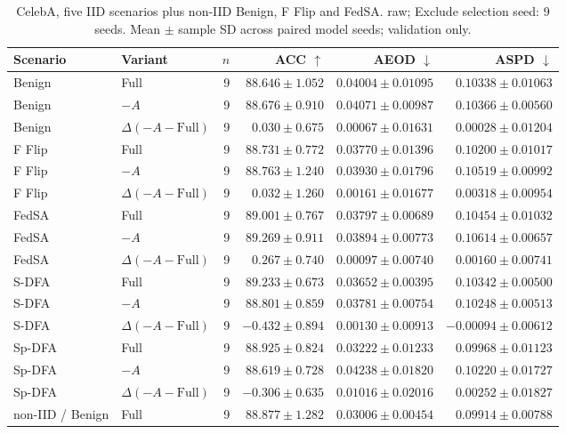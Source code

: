 \begin{table}[t]
\centering
\small
\caption{CelebA, five IID scenarios plus non-IID Benign, F Flip and FedSA. raw; Exclude selection seed: 9 seeds. Mean $\pm$ sample SD across paired model seeds; validation only.}
\begin{tabular}{llrrrr}
\toprule
Scenario & Variant & $n$ & ACC $\uparrow$ & AEOD $\downarrow$ & ASPD $\downarrow$ \\
\midrule
Benign & Full & 9 & $88.646 \pm 1.052$ & $0.04004 \pm 0.01095$ & $0.10338 \pm 0.01063$ \\
Benign & $-A$ & 9 & $88.676 \pm 0.910$ & $0.04071 \pm 0.00987$ & $0.10366 \pm 0.00560$ \\
Benign & $\Delta(-A-\mathrm{Full})$ & 9 & $0.030 \pm 0.675$ & $0.00067 \pm 0.01631$ & $0.00028 \pm 0.01204$ \\
F Flip & Full & 9 & $88.731 \pm 0.772$ & $0.03770 \pm 0.01396$ & $0.10200 \pm 0.01017$ \\
F Flip & $-A$ & 9 & $88.763 \pm 1.240$ & $0.03930 \pm 0.01796$ & $0.10519 \pm 0.00992$ \\
F Flip & $\Delta(-A-\mathrm{Full})$ & 9 & $0.032 \pm 1.260$ & $0.00161 \pm 0.01677$ & $0.00318 \pm 0.00954$ \\
FedSA & Full & 9 & $89.001 \pm 0.767$ & $0.03797 \pm 0.00689$ & $0.10454 \pm 0.01032$ \\
FedSA & $-A$ & 9 & $89.269 \pm 0.911$ & $0.03894 \pm 0.00773$ & $0.10614 \pm 0.00657$ \\
FedSA & $\Delta(-A-\mathrm{Full})$ & 9 & $0.267 \pm 0.740$ & $0.00097 \pm 0.00740$ & $0.00160 \pm 0.00741$ \\
S-DFA & Full & 9 & $89.233 \pm 0.673$ & $0.03652 \pm 0.00395$ & $0.10342 \pm 0.00500$ \\
S-DFA & $-A$ & 9 & $88.801 \pm 0.859$ & $0.03781 \pm 0.00754$ & $0.10248 \pm 0.00513$ \\
S-DFA & $\Delta(-A-\mathrm{Full})$ & 9 & $-0.432 \pm 0.894$ & $0.00130 \pm 0.00913$ & $-0.00094 \pm 0.00612$ \\
Sp-DFA & Full & 9 & $88.925 \pm 0.824$ & $0.03222 \pm 0.01233$ & $0.09968 \pm 0.01123$ \\
Sp-DFA & $-A$ & 9 & $88.619 \pm 0.728$ & $0.04238 \pm 0.01820$ & $0.10220 \pm 0.01727$ \\
Sp-DFA & $\Delta(-A-\mathrm{Full})$ & 9 & $-0.306 \pm 0.635$ & $0.01016 \pm 0.02016$ & $0.00252 \pm 0.01827$ \\
non-IID / Benign & Full & 9 & $88.877 \pm 1.282$ & $0.03006 \pm 0.00454$ & $0.09914 \pm 0.00788$ \\

\end{tabular}
\end{table}
